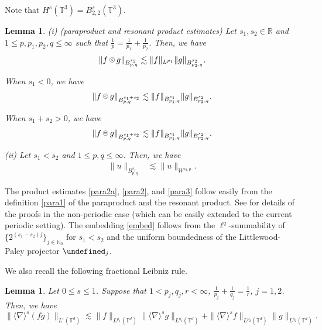 \documentclass[%
11pt,  reqno]{amsart}
\newcommand{\pe}{\mathbin{\scaleobj{0.7}{\tikz \draw (0,0) node[shape=circle,draw,inner sep=0pt,minimum size=8.5pt] {\scriptsize  $=$};}}}
\newcommand{\pl}{\mathbin{\scaleobj{0.7}{\tikz \draw (0,0) node[shape=circle,draw,inner sep=0pt,minimum size=8.5pt] {\scriptsize $<$};}}}
\newtheorem{lemma}[theorem]{Lemma}
\newcommand{\1}{\hspace{0.2mm}\text{I}\hspace{0.2mm}}
\newcommand{\noi}{\noindent}
\newcommand{\R}{\mathbb{R}}
\newcommand{\T}{\mathbb{T}}
\let\P= \undefined
\newcommand{\P}{\mathbf{P}}
\newcommand{\nb}{\nabla}
\renewcommand{\l}{\ell}
\newcommand{\les}{\lesssim}
\newcommand{\jb}[1]
{\langle #1 \rangle}
\newcommand{\N}{\mathbb{N}}
\numberwithin{equation}{section}
\numberwithin{theorem}{section}
\begin{document}
\noi
Note that  $H^s(\T^3) = B^s_{2,2}(\T^3)$.

\begin{lemma}\label{LEM:para}
\textup{(i) (paraproduct and resonant product estimates)}
Let $s_1, s_2 \in \R$ and $1 \leq p, p_1, p_2, q \leq \infty$ such that 
$\frac{1}{p} = \frac 1{p_1} + \frac 1{p_2}$.
Then, we have 
\begin{align}
\| f\pl g \|_{B^{s_2}_{p, q}} \les 
\|f \|_{L^{p_1}} 
\|  g \|_{B^{s_2}_{p_2, q}}.  
\label{para2a}
\end{align}


\noi
When $s_1 < 0$, we have
\begin{align}
\| f\pl g \|_{B^{s_1 + s_2}_{p, q}} \les 
\|f \|_{B^{s_1 }_{p_1, q}} 
\|  g \|_{B^{s_2}_{p_2, q}}.  
\label{para2}
\end{align}

\noi
When $s_1 + s_2 > 0$, we have
\begin{align}
\| f\pe g \|_{B^{s_1 + s_2}_{p, q}} \les 
\|f \|_{B^{s_1 }_{p_1, q}} 
\|  g \|_{B^{s_2}_{p_2, q}}  .
\label{para3}
\end{align}



\noi
\textup{(ii)}
Let $s_1 <  s_2 $ and $1\leq p, q \leq \infty$.
Then, we have 
\begin{align} 
\| u \|_{B^{s_1}_{p,q}} 
&\les \| u \|_{W^{s_2, p}}.
\label{embed}
\end{align}

\end{lemma}


The product estimates \eqref{para2a},  \eqref{para2},  and \eqref{para3}
follow easily from the definition \eqref{para1} of the paraproduct 
and the resonant product.
See \cite{BCD, MW2} for details of the proofs in the non-periodic case
(which can be easily extended to the current periodic setting).
The embedding \eqref{embed}
 follows from the $\l^{q}$-summability 
of $\big\{2^{(s_1 - s_2)j}\big\}_{j \in \N_0}$ for $s_1 < s_2$
and the uniform boundedness of the Littlewood-Paley projector $\P_j$.


We also recall the following fractional Leibniz rule.
%

\begin{lemma}\label{LEM:bilin}
 Let $0\le s \le 1$.
Suppose that 
 $1<p_j,q_j,r < \infty$, $\frac1{p_j} + \frac1{q_j}= \frac1r$, $j = 1, 2$. 
 Then, we have  
\begin{equation*}  
\| \jb{\nb}^s (fg) \|_{L^r(\T^d)} 
\les  \| f \|_{L^{p_1}(\T^d)} 
\| \jb{\nb}^s g \|_{L^{q_1}(\T^d)} + \| \jb{\nb}^s f \|_{L^{p_2}(\T^d)} 
\|  g \|_{L^{q_2}(\T^d)}.
\end{equation*}  

\end{lemma} 
\end{document}
